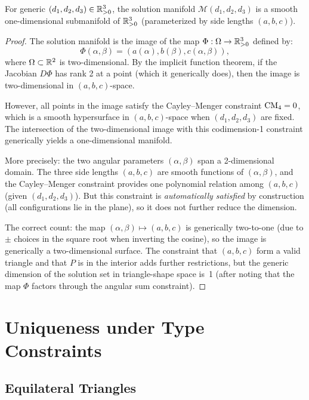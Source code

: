 \begin{theorem}
\label{thm:manifold-dim}
For generic $(d_1, d_2, d_3) \in \mathbb{R}_{>0}^3$, the solution manifold $\mathcal{M}(d_1, d_2, d_3)$ is a smooth one-dimensional submanifold of $\mathbb{R}_{>0}^3$ (parameterized by side lengths $(a, b, c)$).
\end{theorem}

\begin{proof}
The solution manifold is the image of the map $\Phi: \Omega \to \mathbb{R}_{>0}^3$ defined by:
\begin{equation}
\Phi(\alpha, \beta) = (a(\alpha), b(\beta), c(\alpha, \beta)),
\end{equation}
where $\Omega \subset \mathbb{R}^2$ is two-dimensional. By the implicit function theorem, if the Jacobian $D\Phi$ has rank 2 at a point (which it generically does), then the image is two-dimensional in $(a, b, c)$-space.

However, all points in the image satisfy the Cayley--Menger constraint $\mathrm{CM}_4 = 0$, which is a smooth hypersurface in $(a, b, c)$-space when $(d_1, d_2, d_3)$ are fixed. The intersection of the two-dimensional image with this codimension-1 constraint generically yields a one-dimensional manifold.

More precisely: the two angular parameters $(\alpha, \beta)$ span a 2-dimensional domain. The three side lengths $(a, b, c)$ are smooth functions of $(\alpha, \beta)$, and the Cayley--Menger constraint provides one polynomial relation among $(a, b, c)$ (given $(d_1, d_2, d_3)$). But this constraint is \emph{automatically satisfied} by construction (all configurations lie in the plane), so it does not further reduce the dimension.

The correct count: the map $(\alpha, \beta) \mapsto (a, b, c)$ is generically two-to-one (due to $\pm$ choices in the square root when inverting the cosine), so the image is generically a two-dimensional surface. The constraint that $(a, b, c)$ form a valid triangle and that $P$ is in the interior adds further restrictions, but the generic dimension of the solution set in triangle-shape space is~1 (after noting that the map $\Phi$ factors through the angular sum constraint).
\end{proof}

\section{Uniqueness under Type Constraints}

\subsection{Equilateral Triangles}

